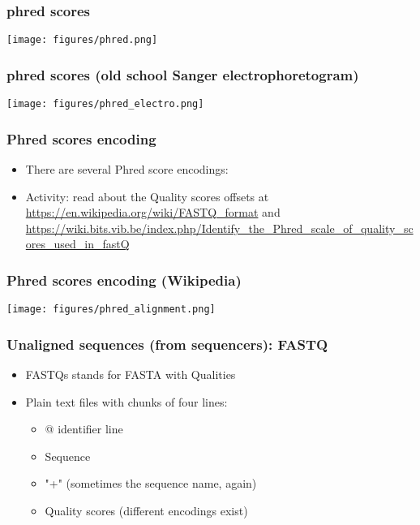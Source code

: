\documentclass{beamer}
\begin{document}
\begin{frame}
  \frametitle{phred scores}
\centering
\texttt{[image: figures/phred.png]}
\end{frame}

\begin{frame}
\frametitle{phred scores (old school Sanger electrophoretogram)}
\centering
\texttt{[image: figures/phred\_electro.png]}  
\end{frame}



\begin{frame}
  \frametitle{Phred scores encoding}
  \begin{itemize}
  \item There are several Phred score encodings:
  \item Activity: read about the Quality scores offsets at \url{https://en.wikipedia.org/wiki/FASTQ_format} and \url{https://wiki.bits.vib.be/index.php/Identify_the_Phred_scale_of_quality_scores_used_in_fastQ}
  \end{itemize}
\end{frame}


\begin{frame}
  \frametitle{Phred scores encoding (Wikipedia)}
\texttt{[image: figures/phred\_alignment.png]}
\end{frame}


\begin{frame}
  \frametitle{Unaligned sequences (from sequencers): FASTQ}
  \begin{itemize}
  \item FASTQs stands for FASTA with Qualities
  \item Plain text files with chunks of four lines:
    \begin{itemize}
    \item  @ identifier line
    \item Sequence
    \item  "+" 	(sometimes the sequence name, again)
    \item Quality scores (different encodings exist)
    \end{itemize}
  \end{itemize}
\end{frame}
\end{document}
